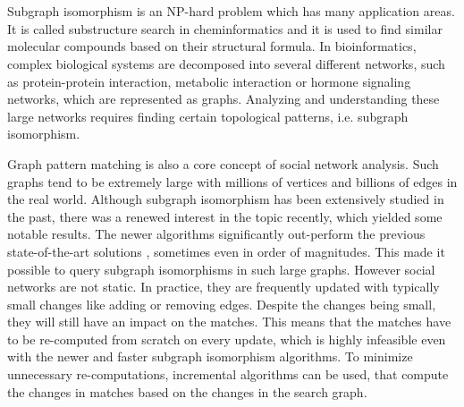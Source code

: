 \chapter{\bevezetes}

Subgraph isomorphism is an NP-hard problem which has many application areas.
It is called substructure search in cheminformatics and it is used to find
similar molecular compounds based on their structural formula. In bioinformatics,
complex biological systems are decomposed into several different networks,
such as protein-protein interaction, metabolic interaction or hormone signaling
networks, which are represented as graphs. Analyzing and understanding these
large networks requires finding certain topological patterns, i.e. subgraph
isomorphism. 

Graph pattern matching is also a core concept of social network analysis.
Such graphs tend to be extremely large with millions of vertices and billions
of edges in the real world. Although subgraph isomorphism has been extensively
studied in the past, there was a renewed interest in the topic recently, which
yielded some notable results. The newer algorithms significantly out-perform
the previous state-of-the-art solutions , sometimes even 
in order of magnitudes. This made it possible to query subgraph isomorphisms
in such large graphs. However social networks are not static. In practice, they
are frequently updated with typically small changes like adding or removing edges.
Despite the changes being small, they will still have an impact on the matches.
This means that the matches have to be re-computed from scratch on every update,
which is highly infeasible even with the newer and faster subgraph isomorphism
algorithms. To minimize unnecessary re-computations, incremental algorithms
can be used, that compute the changes in matches based on the changes in the
search graph.

